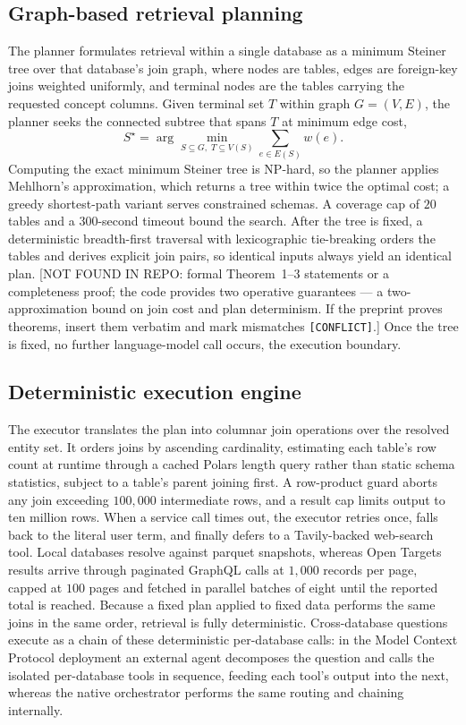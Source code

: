 \subsection*{Graph-based retrieval planning}

The planner formulates retrieval within a single database as a minimum Steiner tree over that database's join graph, where nodes are tables, edges are foreign-key joins weighted uniformly, and terminal nodes are the tables carrying the requested concept columns. Given terminal set $T$ within graph $G=(V,E)$, the planner seeks the connected subtree that spans $T$ at minimum edge cost,
\begin{equation}
S^{\star} = \arg\min_{S \subseteq G,\; T \subseteq V(S)} \sum_{e \in E(S)} w(e).
\label{eq:steiner}
\end{equation}
Computing the exact minimum Steiner tree is NP-hard, so the planner applies Mehlhorn's approximation, which returns a tree within twice the optimal cost; a greedy shortest-path variant serves constrained schemas. A coverage cap of $20$ tables and a $300$-second timeout bound the search. After the tree is fixed, a deterministic breadth-first traversal with lexicographic tie-breaking orders the tables and derives explicit join pairs, so identical inputs always yield an identical plan. [NOT FOUND IN REPO: formal Theorem~1--3 statements or a completeness proof; the code provides two operative guarantees — a two-approximation bound on join cost and plan determinism. If the preprint proves theorems, insert them verbatim and mark mismatches \texttt{[CONFLICT]}.] Once the tree is fixed, no further language-model call occurs, the execution boundary.

\subsection*{Deterministic execution engine}

The executor translates the plan into columnar join operations over the resolved entity set. It orders joins by ascending cardinality, estimating each table's row count at runtime through a cached Polars length query rather than static schema statistics, subject to a table's parent joining first. A row-product guard aborts any join exceeding $100{,}000$ intermediate rows, and a result cap limits output to ten million rows. When a service call times out, the executor retries once, falls back to the literal user term, and finally defers to a Tavily-backed web-search tool. Local databases resolve against parquet snapshots, whereas Open Targets results arrive through paginated GraphQL calls at $1{,}000$ records per page, capped at $100$ pages and fetched in parallel batches of eight until the reported total is reached. Because a fixed plan applied to fixed data performs the same joins in the same order, retrieval is fully deterministic. Cross-database questions execute as a chain of these deterministic per-database calls: in the Model Context Protocol deployment an external agent decomposes the question and calls the isolated per-database tools in sequence, feeding each tool's output into the next, whereas the native orchestrator performs the same routing and chaining internally.

